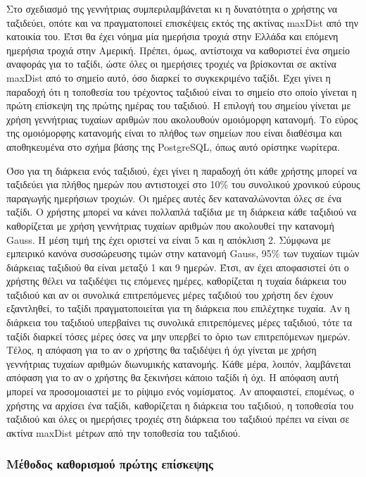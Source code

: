 Στο σχεδιασμό της γεννήτριας συμπεριλαμβάνεται κι η δυνατότητα ο χρήστης να ταξιδεύει, οπότε και να πραγματοποιεί επισκέψεις εκτός της ακτίνας maxDist από 
την κατοικία του. Έτσι θα έχει νόημα μία ημερήσια τροχιά στην Ελλάδα και επόμενη ημερήσια τροχιά στην Αμερική. Πρέπει, όμως, αντίστοιχα να καθοριστεί ένα σημείο αναφοράς 
για το ταξίδι, ώστε όλες οι ημερήσιες τροχιές να βρίσκονται σε ακτίνα maxDist από το σημείο αυτό, όσο διαρκεί το συγκεκριμένο ταξίδι. 
Έχει γίνει η παραδοχή ότι η τοποθεσία του τρέχοντος ταξιδιού είναι το σημείο στο οποίο γίνεται η πρώτη επίσκεψη της πρώτης ημέρας του ταξιδιού. 
Η επιλογή του σημείου γίνεται με χρήση γεννήτριας τυχαίων αριθμών που ακολουθούν ομοιόμορφη κατανομή. Το εύρος της ομοιόμορφης κατανομής είναι το πλήθος των 
σημείων που είναι διαθέσιμα και αποθηκευμένα στο σχήμα βάσης της PostgreSQL, όπως αυτό ορίστηκε νωρίτερα. 

Όσο για τη διάρκεια ενός ταξιδιού, έχει γίνει η παραδοχή ότι κάθε χρήστης μπορεί να ταξιδεύει για πλήθος ημερών που αντιστοιχεί στο 10\% του 
συνολικού χρονικού εύρους παραγωγής ημερήσιων τροχιών. Οι ημέρες αυτές δεν καταναλώνονται όλες σε ένα ταξίδι. Ο χρήστης μπορεί να κάνει πολλαπλά ταξίδια με τη 
διάρκεια κάθε ταξιδιού να καθορίζεται με χρήση γεννήτριας τυχαίων αριθμών που ακολουθεί την κατανομή Gauss. Η μέση τιμή της έχει οριστεί να είναι 5 και η απόκλιση 2. 
Σύμφωνα με εμπειρικό κανόνα συσσώρευσης τιμών στην κατανομή Gauss, 95\% των τυχαίων τιμών διάρκειας ταξιδιού θα είναι μεταξύ 1 και 9 ημερών. Έτσι, αν έχει αποφασιστεί 
ότι ο χρήστης θέλει να ταξιδέψει τις επόμενες ημέρες, καθορίζεται η τυχαία διάρκεια του ταξιδιού και αν οι συνολικά επιτρεπόμενες μέρες ταξιδιού του χρήστη δεν έχουν 
εξαντληθεί, το ταξίδι πραγματοποιείται για τη διάρκεια που επιλέχτηκε τυχαία. Αν η διάρκεια του ταξιδιού υπερβαίνει τις συνολικά επιτρεπόμενες μέρες ταξιδιού, 
τότε τα ταξίδι διαρκεί τόσες μέρες όσες να μην υπερβεί το όριο των επιτρεπόμενων ημερών. Τέλος, η απόφαση για το αν ο χρήστης θα ταξιδέψει ή όχι γίνεται με 
χρήση γεννήτριας τυχαίων αριθμών διωνυμικής κατανομής. Κάθε μέρα, λοιπόν, λαμβάνεται απόφαση για το αν ο χρήστης θα ξεκινήσει κάποιο ταξίδι ή όχι. Η απόφαση αυτή 
μπορεί να προσομοιαστεί με το ρίψιμο ενός νομίσματος. Αν αποφαιστεί, επομένως, ο χρήστης να αρχίσει ένα ταξίδι, καθορίζεται η διάρκεια του ταξιδιού, η 
τοποθεσία του ταξιδιού και όλες οι ημερήσιες τροχιές στη διάρκεια του ταξιδιού πρέπει να είναι σε ακτίνα maxDist μέτρων από την τοποθεσία του ταξιδιού. 


\subsubsection{Μέθοδος καθορισμού πρώτης επίσκεψης}

